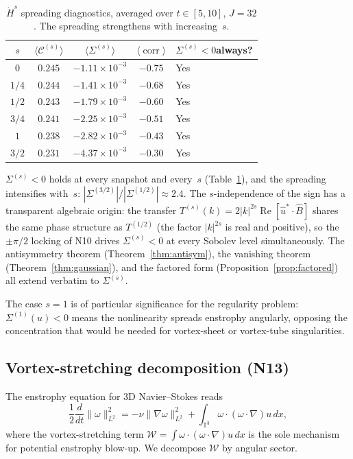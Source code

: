 \documentclass[11pt]{article}
\theoremstyle{definition}
\newcommand{\T}{\mathbb{T}}
\newcommand{\Hdot}[1]{\dot{H}^{#1}}
\newcommand{\cC}{\mathcal{C}}
\DeclareMathOperator{\re}{Re}
\DeclareMathOperator{\corr}{corr}
\begin{document}
\begin{table}[h]
\centering
\caption{$\Hdot{s}$ spreading diagnostics, averaged
over $t\in[5,10]$, $J=32$.  The spreading strengthens
with increasing~$s$.}
\label{tab:Hs}
\begin{tabular}{@{}ccccl@{}}
\toprule
$s$ & $\langle\cC^{(s)}\rangle$
  & $\langle\Sigma^{(s)}\rangle$
  & $\langle\corr\rangle$
  & $\Sigma^{(s)}<0$\;always? \\
\midrule
$0$   & $0.245$ & $-1.11\times 10^{-3}$ & $-0.75$ & Yes \\
$1/4$ & $0.244$ & $-1.41\times 10^{-3}$ & $-0.68$ & Yes \\
$1/2$ & $0.243$ & $-1.79\times 10^{-3}$ & $-0.60$ & Yes \\
$3/4$ & $0.241$ & $-2.25\times 10^{-3}$ & $-0.51$ & Yes \\
$1$   & $0.238$ & $-2.82\times 10^{-3}$ & $-0.43$ & Yes \\
$3/2$ & $0.231$ & $-4.37\times 10^{-3}$ & $-0.30$ & Yes \\
\bottomrule
\end{tabular}
\end{table}

$\Sigma^{(s)}<0$ holds at every snapshot and every~$s$
(Table~\ref{tab:Hs}), and the spreading intensifies
with~$s$: $|\Sigma^{(3/2)}|/|\Sigma^{(1/2)}|\approx 2.4$.
The $s$-independence of the sign has a transparent
algebraic origin: the transfer
$T^{(s)}(k)=2|k|^{2s}\re[\hat u^*\cdot\hat B]$
shares the same phase structure as $T^{(1/2)}$
(the factor $|k|^{2s}$ is real and positive), so the
$\pm\pi/2$ locking of N10 drives
$\Sigma^{(s)}<0$ at every Sobolev level simultaneously.
The antisymmetry theorem (Theorem~\ref{thm:antisym}),
the vanishing theorem (Theorem~\ref{thm:gaussian}),
and the factored form (Proposition~\ref{prop:factored})
all extend verbatim to $\Sigma^{(s)}$.

The case $s=1$ is of particular significance for the
regularity problem: $\Sigma^{(1)}(u) < 0$ means the
nonlinearity spreads enstrophy angularly, opposing the
concentration that would be needed for vortex-sheet or
vortex-tube singularities.


\subsection{Vortex-stretching decomposition (N13)}
\label{sec:stretching}

The enstrophy equation for 3D Navier--Stokes reads
\begin{equation}\label{eq:enstrophy}
\frac{1}{2}\frac{d}{dt}\|\omega\|_{L^2}^2
= -\nu\|\nabla\omega\|_{L^2}^2
+ \int_{\T^3}\omega\cdot(\omega\cdot\nabla)u\,dx,
\end{equation}
where the vortex-stretching term
$\mathcal{W}=\int\omega\cdot(\omega\cdot\nabla)u\,dx$
is the sole mechanism for potential enstrophy blow-up.
We decompose $\mathcal{W}$ by angular sector.
\end{document}
